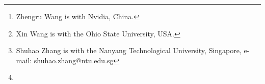\author{Zhengru Wang, Xin Wang, Shuhao Zhang%
\thanks{Zhengru Wang is with Nvidia, China.}%
\thanks{Xin Wang is with the Ohio State University, USA.}%
\thanks{Shuhao Zhang is with the Nanyang Technological University, Singapore, e-mail: shuhao.zhang@ntu.edu.sg}%
\thanks{}}


